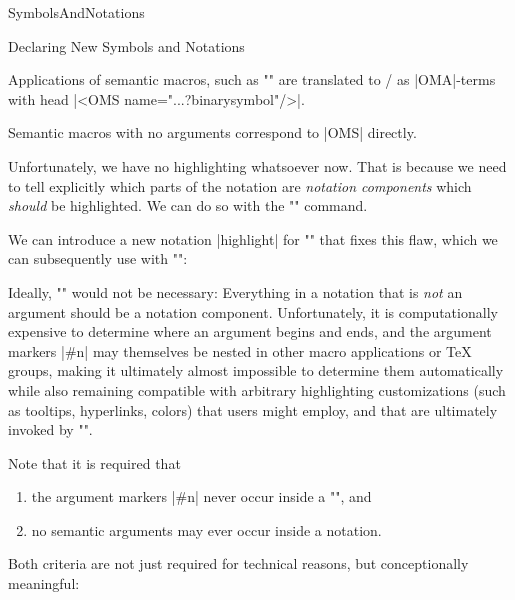 \begin{smodule}[ns=https://github.com/slatex/sTeX/doc]{SymbolsAndNotations}
\begin{sfragment}{Declaring New Symbols and Notations}
    \begin{mmtbox}
        Applications of semantic macros, such as 
        \stexcode"" are translated to \mmt/\omdoc
        as |OMA|-terms with head |<OMS name="...?binarysymbol"/>|.

        Semantic macros with no arguments correspond to
        |OMS| directly.
    \end{mmtbox}

    \begin{function}{\comp}
        Unfortunately, we have no highlighting whatsoever now.
        That is because we need to tell \sTeX explicitly which parts
        of the notation are \emph{notation components} which \emph{should}
        be highlighted.
        We can do so with the \stexcode"\comp" command.
    \end{function}

    We can introduce a new notation |highlight| for 
    \stexcode"\binarysymbol" that fixes this flaw, which we can
    subsequently use with \stexcode"\binarysymbol[highlight]":


    \begin{dangerbox}
        Ideally, \stexcode"\comp" would not be necessary: Everything
        in a notation that is \emph{not} an argument should be a notation
        component. Unfortunately, it is computationally expensive
        to determine where an argument begins and ends, and
        the argument markers |#n| may themselves be nested in other macro applications
        or \TeX\xspace groups,
        making it ultimately almost impossible to determine them automatically
        while also remaining compatible with arbitrary highlighting customizations
        (such as tooltips, hyperlinks, colors) that users might employ, and
        that are ultimately invoked by \stexcode"\comp".
    \end{dangerbox}
    \begin{dangerbox}
        Note that it is required that 
        \begin{enumerate}
            \item the argument markers |#n| never occur inside a \stexcode"\comp", and
            \item no semantic arguments may ever occur inside a notation.
        \end{enumerate}
        Both criteria are not just required for technical reasons,
        but conceptionally meaningful: 
        

\end{dangerbox}
\end{sfragment}
\end{smodule}
